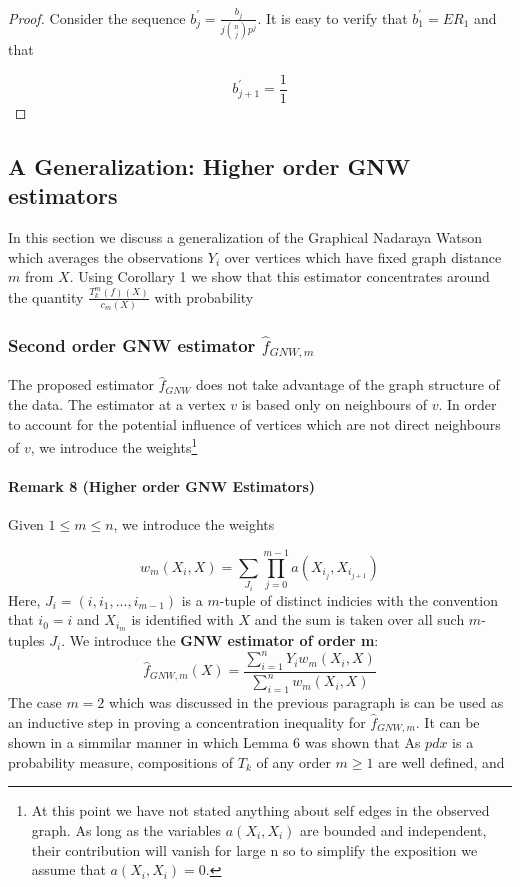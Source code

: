 \documentclass{article}
\begin{document}
\begin{proof}
Consider the sequence $b^{'}_j=\frac{b_j}{j{n\choose j}p^j}$. It is easy to verify that $b^{'}_1=ER_1$ and that 

\begin{equation*}
    b^{'}_{j+1}=\frac{1}{1}
\end{equation*}
\end{proof}



\subsection{A Generalization: Higher order GNW estimators}

In this section we discuss a generalization of the Graphical Nadaraya Watson which averages the observations $Y_i$ over vertices which have fixed graph distance $m$ from $X$. Using Corollary 1 we show that this estimator concentrates around the quantity $\frac{T_k^m(f)(X)}{c_m(X)}$ with probability 

\subsubsection{Second order GNW estimator \texorpdfstring{$\hat{f}_{GNW,m}$}{Lg}}

The proposed estimator $\hat{f}_{GNW}$ does not take advantage of the graph structure of the data. The estimator at a vertex
$v$ is based only on neighbours of 
$v$. In order to account for the potential influence of vertices which are not direct neighbours of $v$, we introduce the weights\footnote{ At this point we have not stated anything about self edges in the observed graph. As long as the variables $a(X_i,X_i)$ are
bounded and 
independent, their contribution will vanish for large n so to simplify the exposition we assume that $a(X_i,X_i)=0$.
}
\paragraph{Remark 8 (Higher order GNW Estimators)}
Given $1\leq m\leq n$, we introduce the weights

\begin{equation*}
    w_m(X_i,X)=\sum_{J_{i}} \prod_{j=0}^{m-1} a(X_{i_j},X_{i_{j+1}})
\end{equation*}
Here, $J_{i}=(i,i_1,...,i_{m-1})$ is a $m$-tuple of distinct indicies with the convention that
$i_0=i$ and $X_{i_m}$ is identified with $X$ and the sum is taken over all such $m$-tuples $J_i$. We introduce the \textbf{GNW estimator of order m}:
\begin{equation*}
    \hat{f}_{GNW,m}(X)=\frac{\sum_{i=1}^n Y_iw_m(X_i,X)}{\sum_{i=1}^n w_m(X_i,X)}
\end{equation*}
The case $m=2$ which was discussed in the previous paragraph is can be used as an inductive step in proving a concentration inequality for $\hat{f}_{GNW,m}$. It can be shown in a simmilar manner in which Lemma 6 was shown that 
As $pdx$ is a probability measure, compositions of $T_k$ of any order
$m\geq 1$
are well defined, and 
\end{document}
